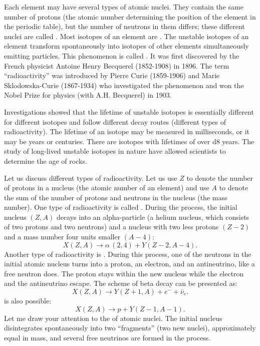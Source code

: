  Each element may
have several types of atomic nuclei. They contain the same number of
protons (the atomic number determining the position of the element in
the periodic table), but the number of neutrons in them differs; these
different nuclei are called . Most isotopes of an element are
. The unstable isotopes of an element transform spontaneously into isotopes of other elements simultaneously emitting particles. This phenomenon is called . It was first discovered by the French physicist Antoine Henry Becquerel (1852-1908) in 1896. The term ``radioactivity'' was introduced by Pierre Curie (1859-1906) and Marie Sklodowska-Curie (1867-1934) who investigated the phenomenon and won the Nobel Prize for physics (with A.H. Becquerel) in 1903.

Investigations showed that the lifetime of unstable isotopes is
essentially different for different isotopes and follow different decay
routes (different types of radioactivity). The lifetime of an isotope may
be measured in milliseconds, or it may be years or centuries. There are
isotopes with lifetimes of over \num{d8} years. The study of long-lived
unstable isotopes in nature have allowed scientists to determine the age
of rocks.

Let us discuss different types of radioactivity. Let us use $Z$ to denote
the number of protons in a nucleus (the atomic number of an element)
and use $A$ to denote the sum of the number of protons and neutrons in
the nucleus (the mass number). One type of radioactivity is called . During the process, the initial nucleus $(Z, A)$ decays into an
alpha-particle (a helium nucleus, which consists of two protons and two
neutrons) and a nucleus with two less protons $(Z - 2)$ and a mass
number four units smaller $(A - 4)$:
\begin{equation*}%
X(Z, A) \to \alpha \, (2, 4) + Y(Z - 2, A - 4).
\end{equation*}
Another type of radioactivity is . During this process, one of the neutrons in the initial atomic nucleus turns into a proton, an
electron, and an antineutrino, like a free neutron does. The proton stays
within the new nucleus while the electron and the antineutrino escape.
The scheme of beta decay can be presented as:
\begin{equation*}%
X (Z, A) \to Y(Z + 1, A) + e^{-} + \bar{\nu}_{e}.
\end{equation*}
 is also possible:
\begin{equation*}%
X(Z, A) \to p + Y(Z - 1, A - 1).
\end{equation*}
Let me draw your attention to the  of atomic
nuclei. The initial nucleus disintegrates spontaneously into two
``fragments'' (two new nuclei), approximately equal in mass, and several
free neutrinos are formed in the process.


